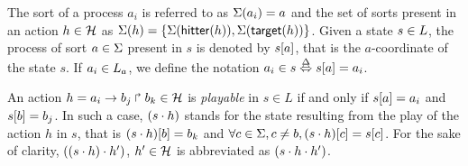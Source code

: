 \noindent
The sort of a process $a_i$ is referred to as $\Sigma(a_i)=a$ and the set of
sorts present in an action $h\in\mathcal{H}$ as 
$\Sigma(h) = \{\Sigma(\mathsf{hitter}(h)),\Sigma(\mathsf{target}(h))\}$.
Given a state $s\in L$, the process of sort $a\in\Sigma$ present in $s$ is
denoted by ${s[a]}$, that is the $a$-coordinate of the state $s$.
If $a_i\in L_a$, we define the notation $a_i\in s \stackrel{\Delta}\Leftrightarrow {s[a]}=a_i$.

An action $h=a_i\rightarrow b_j\Rsh b_k \in\mathcal{H}$ is \emph{playable} in $s\in L$
if and only if ${s[a]}=a_i$ and ${s[b]}=b_j$.
In such a case, $(s\cdot h)$ stands for the state resulting from the play of
the action $h$ in $s$, that is 
${(s\cdot h)[b]} = b_k$ and 
$\forall c\in\Sigma, c\neq b, {(s\cdot h)[c]} = {s[c]}$.
For the sake of clarity, $((s\cdot h)\cdot h')$, $h'\in\mathcal{H}$ is abbreviated as
$(s\cdot h\cdot h')$.

